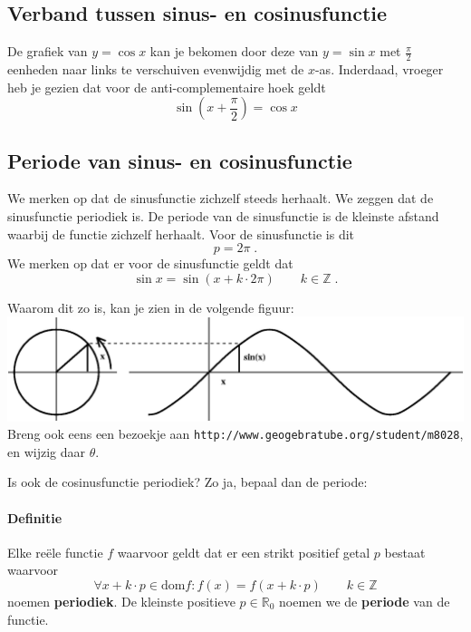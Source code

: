 \documentclass[a4paper,12pt,twoside ]{article}
\begin{document}
\pagebreak
\subsection{Verband tussen sinus- en cosinusfunctie}

De grafiek van $y=\cos x$ kan je bekomen door deze van $y=\sin x$ met $\frac{\pi}{2}$ eenheden naar links te verschuiven evenwijdig met de $x$-as. Inderdaad, vroeger heb je gezien dat voor de anti-complementaire hoek geldt
$$\sin(x+\dfrac{\pi}{2})=\cos x$$

\subsection{Periode van sinus- en cosinusfunctie}

We merken op dat de sinusfunctie zichzelf steeds herhaalt. We zeggen dat de sinusfunctie periodiek is. De periode van de sinusfunctie is de kleinste afstand waarbij de functie zichzelf herhaalt. Voor de sinusfunctie is dit
$$p=2\pi\;.$$
We merken op dat er voor de sinusfunctie geldt dat
$$ \sin x = \sin (x+k\cdot 2\pi)\qquad k\in\mathbb{Z}\;.$$

Waarom dit zo is, kan je zien in de volgende figuur:\\
\includegraphics[width=\textwidth]{goniometriccircle_sine}
Breng ook eens een bezoekje aan \verb#http://www.geogebratube.org/student/m8028#, en wijzig daar $\theta$.

\begin{oefening}
Is ook de cosinusfunctie periodiek? Zo ja, bepaal dan de periode:
\end{oefening}

\paragraph{Definitie}
\begin{mdframed}
Elke reële functie $f$ waarvoor geldt dat er een strikt positief getal $p$ bestaat waarvoor
$$\forall x+k\cdot p \in \mbox{dom} f: f(x)=f(x+k\cdot p)\qquad k\in\mathbb{Z}$$
noemen {\bf periodiek}. De kleinste positieve $p\in\mathbb{R}_0$ noemen we de {\bf periode} van de functie.
\end{mdframed}
\end{document}
